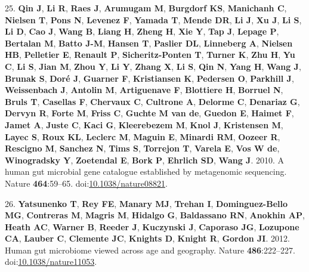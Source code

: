 \documentclass[12pt,]{article}
\begin{document}
\hypertarget{ref-Qin2010}{}
25. \textbf{Qin J}, \textbf{Li R}, \textbf{Raes J}, \textbf{Arumugam M},
\textbf{Burgdorf KS}, \textbf{Manichanh C}, \textbf{Nielsen T},
\textbf{Pons N}, \textbf{Levenez F}, \textbf{Yamada T}, \textbf{Mende
DR}, \textbf{Li J}, \textbf{Xu J}, \textbf{Li S}, \textbf{Li D},
\textbf{Cao J}, \textbf{Wang B}, \textbf{Liang H}, \textbf{Zheng H},
\textbf{Xie Y}, \textbf{Tap J}, \textbf{Lepage P}, \textbf{Bertalan M},
\textbf{Batto J-M}, \textbf{Hansen T}, \textbf{Paslier DL},
\textbf{Linneberg A}, \textbf{Nielsen HB}, \textbf{Pelletier E},
\textbf{Renault P}, \textbf{Sicheritz-Ponten T}, \textbf{Turner K},
\textbf{Zhu H}, \textbf{Yu C}, \textbf{Li S}, \textbf{Jian M},
\textbf{Zhou Y}, \textbf{Li Y}, \textbf{Zhang X}, \textbf{Li S},
\textbf{Qin N}, \textbf{Yang H}, \textbf{Wang J}, \textbf{Brunak S},
\textbf{Doré J}, \textbf{Guarner F}, \textbf{Kristiansen K},
\textbf{Pedersen O}, \textbf{Parkhill J}, \textbf{Weissenbach J},
\textbf{Antolin M}, \textbf{Artiguenave F}, \textbf{Blottiere H},
\textbf{Borruel N}, \textbf{Bruls T}, \textbf{Casellas F},
\textbf{Chervaux C}, \textbf{Cultrone A}, \textbf{Delorme C},
\textbf{Denariaz G}, \textbf{Dervyn R}, \textbf{Forte M}, \textbf{Friss
C}, \textbf{Guchte M van de}, \textbf{Guedon E}, \textbf{Haimet F},
\textbf{Jamet A}, \textbf{Juste C}, \textbf{Kaci G}, \textbf{Kleerebezem
M}, \textbf{Knol J}, \textbf{Kristensen M}, \textbf{Layec S},
\textbf{Roux KL}, \textbf{Leclerc M}, \textbf{Maguin E}, \textbf{Minardi
RM}, \textbf{Oozeer R}, \textbf{Rescigno M}, \textbf{Sanchez N},
\textbf{Tims S}, \textbf{Torrejon T}, \textbf{Varela E}, \textbf{Vos W
de}, \textbf{Winogradsky Y}, \textbf{Zoetendal E}, \textbf{Bork P},
\textbf{Ehrlich SD}, \textbf{Wang J}. 2010. A human gut microbial gene
catalogue established by metagenomic sequencing. Nature
\textbf{464}:59--65.
doi:\href{https://doi.org/10.1038/nature08821}{10.1038/nature08821}.

\hypertarget{ref-yatsunenkoux5fhumanux5f2012}{}
26. \textbf{Yatsunenko T}, \textbf{Rey FE}, \textbf{Manary MJ},
\textbf{Trehan I}, \textbf{Dominguez-Bello MG}, \textbf{Contreras M},
\textbf{Magris M}, \textbf{Hidalgo G}, \textbf{Baldassano RN},
\textbf{Anokhin AP}, \textbf{Heath AC}, \textbf{Warner B},
\textbf{Reeder J}, \textbf{Kuczynski J}, \textbf{Caporaso JG},
\textbf{Lozupone CA}, \textbf{Lauber C}, \textbf{Clemente JC},
\textbf{Knights D}, \textbf{Knight R}, \textbf{Gordon JI}. 2012. Human
gut microbiome viewed across age and geography. Nature
\textbf{486}:222--227.
doi:\href{https://doi.org/10.1038/nature11053}{10.1038/nature11053}.
\end{document}
